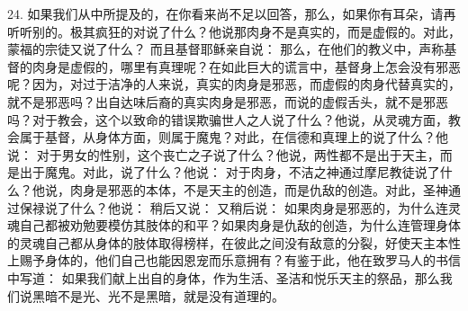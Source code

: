 24. 如果我们从中所提及的，在你看来尚不足以回答，那么，如果你有耳朵，请再听听别的。极其疯狂的对说了什么？他说那肉身不是真实的，而是虚假的。对此，蒙福的宗徒又说了什么？ 而且基督耶稣亲自说： 那么，在他们的教义中，声称基督的肉身是虚假的，哪里有真理呢？在如此巨大的谎言中，基督身上怎会没有邪恶呢？因为，对过于洁净的人来说，真实的肉身是邪恶，而虚假的肉身代替真实的，就不是邪恶吗？出自达味后裔的真实肉身是邪恶，而说的虚假舌头，就不是邪恶吗？对于教会，这个以致命的错误欺骗世人之人说了什么？他说，从灵魂方面，教会属于基督，从身体方面，则属于魔鬼？对此，在信德和真理上的说了什么？他说： 对于男女的性别，这个丧亡之子说了什么？他说，两性都不是出于天主，而是出于魔鬼。对此，说了什么？他说： 对于肉身，不洁之神通过摩尼教徒说了什么？他说，肉身是邪恶的本体，不是天主的创造，而是仇敌的创造。对此，圣神通过保禄说了什么？他说： 稍后又说： 又稍后说： 如果肉身是邪恶的，为什么连灵魂自己都被劝勉要模仿其肢体的和平？如果肉身是仇敌的创造，为什么连管理身体的灵魂自己都从身体的肢体取得榜样，在彼此之间没有敌意的分裂，好使天主本性上赐予身体的，他们自己也能因恩宠而乐意拥有？有鉴于此，他在致罗马人的书信中写道： 如果我们献上出自的身体，作为生活、圣洁和悦乐天主的祭品，那么我们说黑暗不是光、光不是黑暗，就是没有道理的。\par

